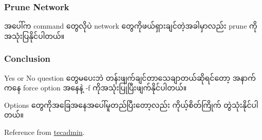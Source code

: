 \hypertarget{prune-network}{%
\subsubsection{Prune Network}\label{prune-network}}

အပေါ်က command တွေလိုပဲ network တွေကိုဖယ်ရှားချင်တဲ့အခါမှာလည်း prune
ကိုအသုံးပြနိုင်ပါတယ်။

\begin{Shaded}
\begin{Highlighting}[]
\NormalTok{$ }
\end{Highlighting}
\end{Shaded}

\hypertarget{conclusion}{%
\subsubsection{Conclusion}\label{conclusion}}

Yes or No question တွေမပေးဘဲ တန်းဖျက်ချင်တာသေချာတယ်ဆိုရင်တော့ အနာက်ကနေ
force option အနေနဲ့ -f ကိုအသုံးပြုပြီးဖျက်နိုင်ပါတယ်။

\begin{Shaded}
\begin{Highlighting}[]
\NormalTok{$ }
\NormalTok{$ }
\NormalTok{$ }
\NormalTok{$ }
\NormalTok{$ }
\end{Highlighting}
\end{Shaded}

Options တွေကိုအခြေအနေအပေါ်မူတည်ပြီးတော့လည်း ကိုယ့်စိတ်ကြိုက်
တွဲသုံးနိုင်ပါတယ်။

\begin{Shaded}
\begin{Highlighting}[]
\NormalTok{$ }
\NormalTok{$ }
\NormalTok{$ }
\NormalTok{$ }
\NormalTok{$ }
\end{Highlighting}
\end{Shaded}

Reference from
\href{https://tecadmin.net/tutorial/docker/docker-prune-unused-objects/}{tecadmin}.

